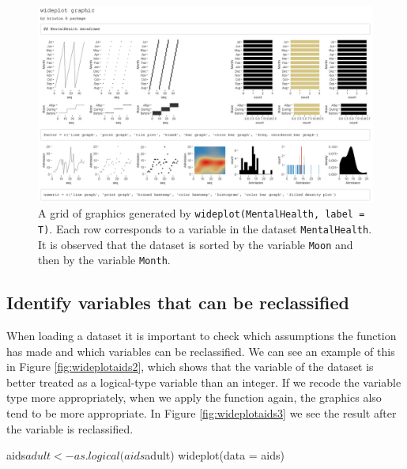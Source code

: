 \begin{Schunk}
	\begin{figure}[H]
\includegraphics[width=0.8\linewidth]{figures/wideplot_MentalHealth0} \caption[Output of 'wideplot(MentalHealth, label = T)']{A grid of graphics generated by \texttt{wideplot(MentalHealth, label = T)}. Each row corresponds to a variable in the dataset \texttt{MentalHealth}. It is observed that the dataset is sorted by the variable \texttt{Moon} and then by the variable \texttt{Month}.}\label{fig:wideplotmentalhealth}
	\end{figure}
\end{Schunk}

\hypertarget{identify-variables-that-can-be-reclassified}{%
	\subsection{Identify variables that can be
reclassified}\label{identify-variables-that-can-be-reclassified}}

When loading a dataset it is important to check which assumptions the
function has made and which variables can be reclassified. We can see an
example of this in Figure \ref{fig:wideplotaids2}, which shows that the
variable  of the dataset  is better treated as a
logical-type variable than an integer. If we recode the variable type
more appropriately, when we apply the  function again,
the graphics also tend to be more appropriate. In Figure
\ref{fig:wideplotaids3} we see the result after the variable
 is reclassified.

\begin{example}
  aids$adult <- as.logical(aids$adult)
  wideplot(data = aids)
\end{example}


